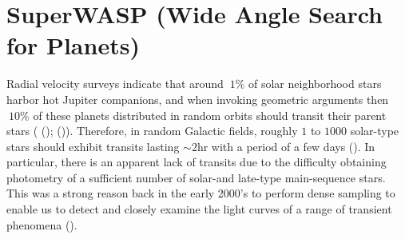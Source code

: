 \section{SuperWASP (Wide Angle Search for Planets)}\label{sec:SWASPdata}

Radial velocity surveys indicate that around $~1\%$ of solar neighborhood stars harbor hot Jupiter companions, and when invoking geometric arguments then $~10\%$ of these planets distributed in random orbits should transit their parent stars ( (\citeyear{2003ASPC..294..405S});  (\citeyear{2006PASP..118.1407P})). Therefore, in random Galactic fields, roughly $1$ to $1000$ solar-type stars should exhibit transits lasting $\sim 2$hr with a period of a few days  (\citeyear{2006PASP..118.1407P}). In particular, there is an apparent lack of transits due to the difficulty obtaining photometry of a sufficient number of solar-and late-type main-sequence stars. This was a strong reason back in the early 2000's to perform dense sampling to enable us to detect and closely examine the light curves of a range of transient phenomena  (\citeyear{2003ASPC..294..405S}).\\

